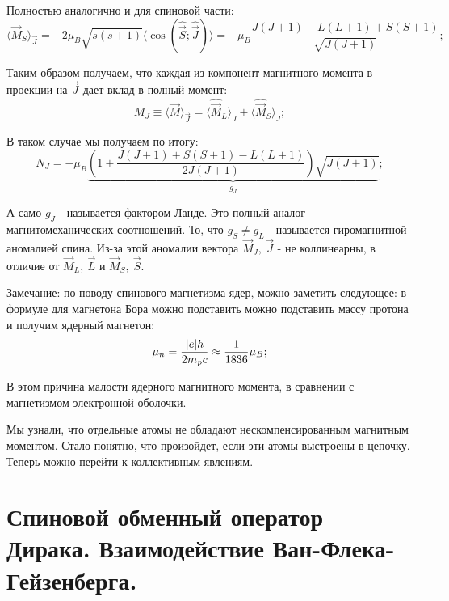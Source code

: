 \documentclass[a4paper, 14pt, russian]{article}
\newcommand{\be}{\begin{equation}}
\newcommand{\ee}{\end{equation}}
\begin{document}
	Полностью аналогично и для спиновой части:
	\be
		\langle \vec{M}_S \rangle_{\vec J} = - 2\mu_B \sqrt{s(s+1)}
			\langle \cos(\hat{\vec S};\hat{\vec J})\rangle = 
			- \mu_B \frac{J(J+1) - L(L+1) + S(S+1)}{\sqrt{J(J+1)}};
	\ee

	Таким образом получаем, что каждая из компонент магнитного момента 
	в проекции на $\vec J$ дает вклад в полный момент:
	\be
		M_J \equiv \langle \vec M \rangle_{\vec J} = \langle \hat{\vec M}_L\rangle_J
			+ \langle \hat{\vec M}_S\rangle_J;
	\ee

	В таком случае мы получаем по итогу:
	\be
		N_J = - \mu_B \underbrace{\left(1 + \frac{J(J+1) + S(S+1) - L(L+1)}{2J(J+1)}\right)
			\sqrt{J(J+1)}}_{g_J};
	\ee

	А само $g_J$ - называется фактором Ланде. Это полный аналог магнитомеханических соотношений.
	То, что $g_S \neq g_L$ - называется гиромагнитной аномалией спина. Из-за этой аномалии
	вектора $\vec{M}_J,~\vec J$ - не коллинеарны, в отличие от $\vec{M}_L,~\vec{L}$ и 
	$\vec{M}_S,~\vec S$.

	Замечание: по поводу спинового магнетизма ядер, можно заметить следующее: в формуле для 
	магнетона Бора можно подставить можно подставить массу протона и получим ядерный магнетон:
	\be
		\mu_n = \frac{\abs{e}\hbar}{2m_p c} \approx \frac{1}{1836} \mu_B;
	\ee

	В этом причина малости ядерного магнитного момента, в  сравнении с магнетизмом электронной 
	оболочки.

	Мы узнали, что отдельные атомы не обладают нескомпенсированным магнитным моментом.
	Стало понятно, что произойдет, если эти атомы выстроены в цепочку. Теперь можно перейти к коллективным явлениям.

	\section{Спиновой обменный оператор Дирака. Взаимодействие Ван-Флека-Гейзенберга.}
\end{document}
